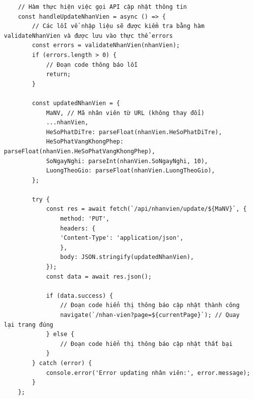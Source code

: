 \begin{verbatim}
    // Hàm thực hiện việc gọi API cập nhật thông tin
    const handleUpdateNhanVien = async () => {
        // Các lỗi về nhập liệu sẽ được kiểm tra bằng hàm validateNhanVien và được lưu vào thực thể errors
        const errors = validateNhanVien(nhanVien);
        if (errors.length > 0) {
            // Đoạn code thông báo lỗi
            return;
        }

        const updatedNhanVien = {
            MaNV, // Mã nhân viên từ URL (không thay đổi)
            ...nhanVien,
            HeSoPhatDiTre: parseFloat(nhanVien.HeSoPhatDiTre),
            HeSoPhatVangKhongPhep: parseFloat(nhanVien.HeSoPhatVangKhongPhep),
            SoNgayNghi: parseInt(nhanVien.SoNgayNghi, 10),
            LuongTheoGio: parseFloat(nhanVien.LuongTheoGio),
        };

        try {
            const res = await fetch(`/api/nhanvien/update/${MaNV}`, {
                method: 'PUT',
                headers: {
                'Content-Type': 'application/json',
                },
                body: JSON.stringify(updatedNhanVien),
            });
            const data = await res.json();

            if (data.success) {
                // Đoạn code hiển thị thông báo cập nhật thành công
                navigate(`/nhan-vien?page=${currentPage}`); // Quay lại trang đúng
            } else {
                // Đoạn code hiển thị thông báo cập nhật thất bại
            }
        } catch (error) {
            console.error('Error updating nhân viên:', error.message);
        }
    };
\end{verbatim}


